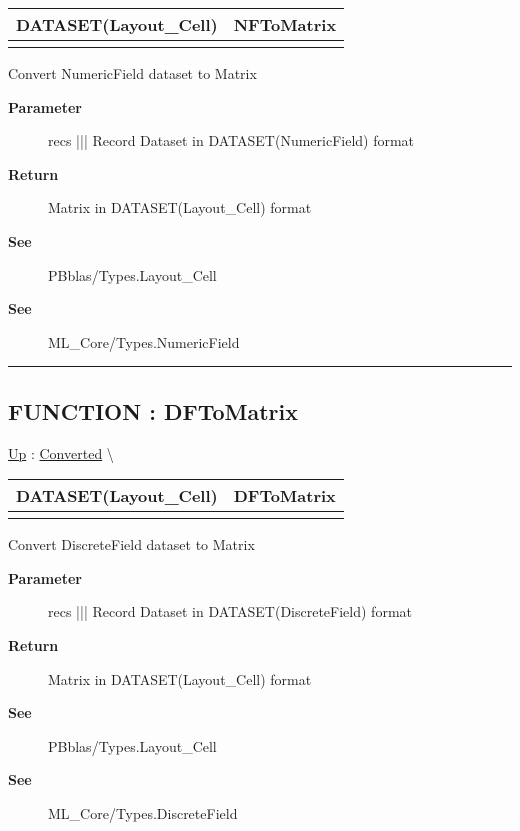 {\renewcommand{\arraystretch}{1.5}
\begin{tabularx}{\textwidth}{|>{\raggedright\arraybackslash}l|X|}
\hline
\hspace{0pt}DATASET(Layout\_Cell) & NFToMatrix \\
\hline
\multicolumn{2}{|>{\raggedright\arraybackslash}X|}{\hspace{0pt}(DATASET(NumericField) recs)} \\
\hline
\end{tabularx}
}

\par
Convert NumericField dataset to Matrix

\par
\begin{description}
\item [\textbf{Parameter}] recs ||| Record Dataset in DATASET(NumericField) format
\item [\textbf{Return}] Matrix in DATASET(Layout\_Cell) format
\item [\textbf{See}] PBblas/Types.Layout\_Cell
\item [\textbf{See}] ML\_Core/Types.NumericField
\end{description}

\rule{\linewidth}{0.5pt}
\subsection*{FUNCTION : DFToMatrix}
\hypertarget{ecldoc:pbblas.converted.dftomatrix}{}
\hyperlink{ecldoc:PBblas.Converted}{Up} :
\hspace{0pt} \hyperlink{ecldoc:PBblas.Converted}{Converted} \textbackslash 

{\renewcommand{\arraystretch}{1.5}
\begin{tabularx}{\textwidth}{|>{\raggedright\arraybackslash}l|X|}
\hline
\hspace{0pt}DATASET(Layout\_Cell) & DFToMatrix \\
\hline
\multicolumn{2}{|>{\raggedright\arraybackslash}X|}{\hspace{0pt}(DATASET(DiscreteField) recs)} \\
\hline
\end{tabularx}
}

\par
Convert DiscreteField dataset to Matrix

\par
\begin{description}
\item [\textbf{Parameter}] recs ||| Record Dataset in DATASET(DiscreteField) format
\item [\textbf{Return}] Matrix in DATASET(Layout\_Cell) format
\item [\textbf{See}] PBblas/Types.Layout\_Cell
\item [\textbf{See}] ML\_Core/Types.DiscreteField
\end{description}

